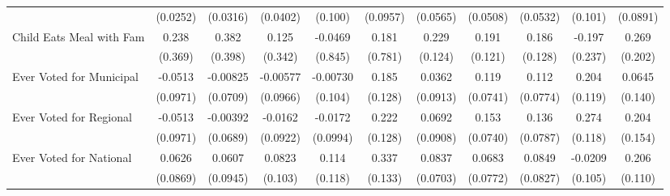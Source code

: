 {\begin{tabular}{l*{10}{c}}
            &    (0.0252)         &    (0.0316)         &    (0.0402)         &     (0.100)         &    (0.0957)         &    (0.0565)         &    (0.0508)         &    (0.0532)         &     (0.101)         &    (0.0891)         \\
\addlinespace
Child Eats Meal with Fam&       0.238         &       0.382         &       0.125         &     -0.0469         &       0.181         &       0.229         &       0.191         &       0.186         &      -0.197         &       0.269         \\
            &     (0.369)         &     (0.398)         &     (0.342)         &     (0.845)         &     (0.781)         &     (0.124)         &     (0.121)         &     (0.128)         &     (0.237)         &     (0.202)         \\
\addlinespace
Ever Voted for Municipal&     -0.0513         &    -0.00825         &    -0.00577         &    -0.00730         &       0.185         &      0.0362         &       0.119         &       0.112         &       0.204         &      0.0645         \\
            &    (0.0971)         &    (0.0709)         &    (0.0966)         &     (0.104)         &     (0.128)         &    (0.0913)         &    (0.0741)         &    (0.0774)         &     (0.119)         &     (0.140)         \\
\addlinespace
Ever Voted for Regional&     -0.0513         &    -0.00392         &     -0.0162         &     -0.0172         &       0.222         &      0.0692         &       0.153\sym{*}  &       0.136         &       0.274\sym{*}  &       0.204         \\
            &    (0.0971)         &    (0.0689)         &    (0.0922)         &    (0.0994)         &     (0.128)         &    (0.0908)         &    (0.0740)         &    (0.0787)         &     (0.118)         &     (0.154)         \\
\addlinespace
Ever Voted for National&      0.0626         &      0.0607         &      0.0823         &       0.114         &       0.337\sym{*}  &      0.0837         &      0.0683         &      0.0849         &     -0.0209         &       0.206         \\
            &    (0.0869)         &    (0.0945)         &     (0.103)         &     (0.118)         &     (0.133)         &    (0.0703)         &    (0.0772)         &    (0.0827)         &     (0.105)         &     (0.110)         \\
\bottomrule
\end{tabular}
}
